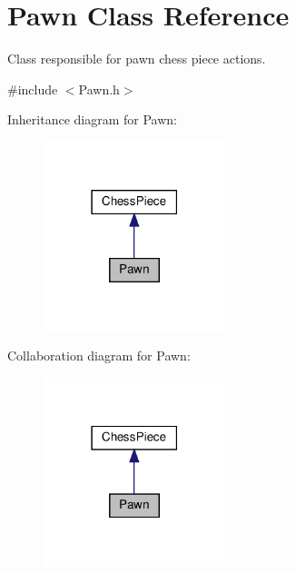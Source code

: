 \hypertarget{classPawn}{}\section{Pawn Class Reference}
\label{classPawn}


Class responsible for pawn chess piece actions.  




{\ttfamily \#include $<$Pawn.\+h$>$}



Inheritance diagram for Pawn\+:\nopagebreak
\begin{figure}[H]
\begin{center}
\leavevmode
\includegraphics[width=150pt]{classPawn__inherit__graph}
\end{center}
\end{figure}


Collaboration diagram for Pawn\+:\nopagebreak
\begin{figure}[H]
\begin{center}
\leavevmode
\includegraphics[width=150pt]{classPawn__coll__graph}
\end{center}
\end{figure}
